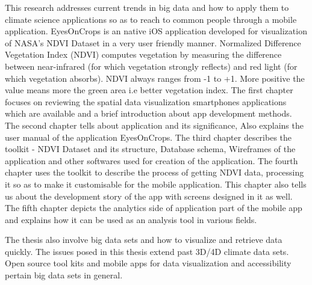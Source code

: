 
This research addresses current trends in big data and how to apply them to climate science applications so as to reach to common people through a mobile application.
EyesOnCrops is an native iOS application developed for visualization of NASA's NDVI Dataset in a very user friendly manner.
Normalized Difference Vegetation Index (NDVI) computes vegetation by measuring the difference between near-infrared (for which vegetation strongly reflects) and red light (for which vegetation absorbs). NDVI always ranges from -1 to +1. More positive the value means more the green area i.e better vegetation index.
The first chapter focuses on reviewing the spatial data visualization smartphones applications which are available and a brief introduction about app development methods.
The second chapter tells about application and its significance, Also explains the user manual of the application EyesOnCrops.
The third chapter describes the toolkit - NDVI Dataset and its structure, Database schema, Wireframes of the application and other softwares used for creation of the application.
The fourth chapter uses the toolkit to describe the process of getting NDVI data, processing it so as to make it customisable for the mobile application. This chapter also tells us about the development story of the app with screens designed in it as well.
The fifth chapter depicts the analytics side of application part of the mobile app and explains how it can be used as an analysis tool in various fields.

The thesis also involve big data sets and how to visualize and retrieve data quickly. The issues posed in this thesis extend past 3D/4D climate data sets. Open source tool kits and mobile apps for data visualization and accessibility pertain big data sets in general. 


